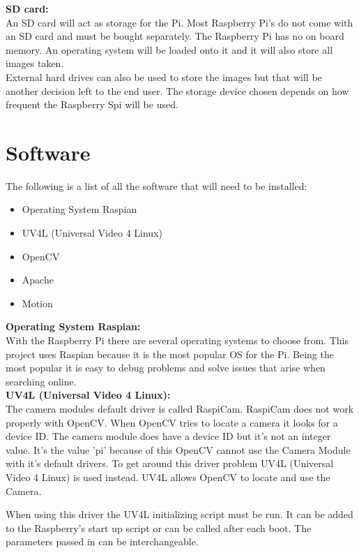 \documentclass[]{report}
\begin{document}
\noindent
{\bf SD card:}\\
\break
An SD card will act as storage for the Pi. Most Raspberry Pi's do not come with an SD card and must be bought separately. The Raspberry Pi has no on board memory. An operating system will be loaded onto it and it will also store all images taken.\\

External hard drives can also be used to store the images but that will be another decision left to the end user. The storage device chosen depends on how frequent the Raspberry Spi will be used.\\


\section {Software}	
\label {sec:software}	
The following is a list of all the software that will need to be installed:
\begin {itemize}
  \item Operating System Raspian 
  \item UV4L (Universal Video 4 Linux)  
  \item OpenCV
  \item Apache
  \item Motion
\end {itemize}

\noindent
{\bf Operating System Raspian:}\\
\break
With the Raspberry Pi there are several operating systems to choose from. This project uses Raspian because it is the most popular OS for the Pi. Being the most popular it is easy to debug problems and solve issues that arise when searching online.\\ 

\noindent
{\bf UV4L (Universal Video 4 Linux):}\\
\break
The camera modules default driver is called RaspiCam. RaspiCam does not work properly with OpenCV. When OpenCV tries to locate a camera it looks for a device ID. The camera module does have a device ID but it's not an integer value. It's the value 'pi' because of this OpenCV cannot use the Camera Module with it's default drivers. To get around this driver problem UV4L (Universal Video 4 Linux) is used instead. UV4L allows OpenCV to locate and use the Camera.

When using this driver the UV4L initializing script must be run. It can be added to the Raspberry's start up script or can be called after each boot. The parameters passed in can be interchangeable.\\
\end{document}
